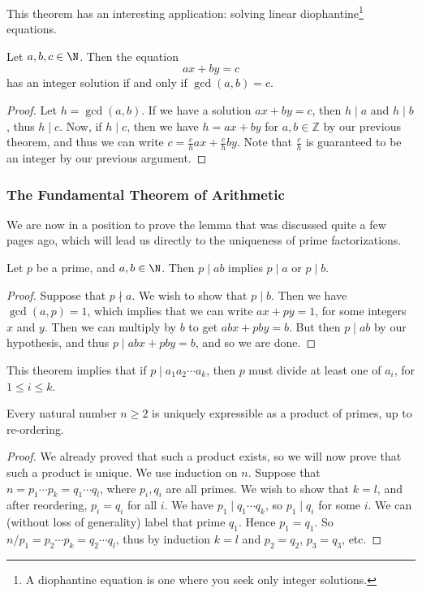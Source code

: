 \documentclass[a4paper]{scrartcl}
\begin{document}
This theorem has an interesting application: solving linear diophantine\footnote{A diophantine equation is one where you seek only integer solutions.} equations. 

\begin{corollary}
	Let $a, b, c \in \N$. Then the equation
	$$
	ax + by = c
	$$
	has an integer solution if and only if $\gcd(a, b) = c$.
\end{corollary}
\begin{proof}
	Let $h = \gcd(a, b)$. If we have a solution $ax + by = c$, then $h \mid a$ and $h \mid b$, thus $h \mid c$. Now, if $h \mid c$, then we have $h = ax + by$ for $a, b \in \mathbb{Z}$ by our previous theorem, and thus we can write $c = \frac{c}{h}ax + \frac{c}{h}by$. Note that $\frac{c}{h}$ is guaranteed to be an integer by our previous argument.
\end{proof}

\subsubsection{The Fundamental Theorem of Arithmetic}

We are now in a position to prove the lemma that was discussed quite a few pages ago, which will lead us directly to the uniqueness of prime factorizations.

\begin{theorem}
	Let $p$ be a prime, and $a, b \in \N$. Then $p \mid ab$ implies $p \mid a$ or $p \mid b$.
\end{theorem}
\begin{proof}
	Suppose that $p \nmid a$. We wish to show that $p \mid b$. Then we have $\gcd(a, p) = 1$, which implies that we can write $ax + py = 1$, for some integers $x$ and $y$. Then we can multiply by $b$ to get $abx + pby = b$. But then $p \mid ab$ by our hypothesis, and thus $p \mid abx + pby = b$, and so we are done.
\end{proof}

\begin{remark}
	This theorem implies that if $p \mid a_1 a_2 \cdots a_k$, then $p$ must divide at least one of $a_i$, for $1 \leq i \leq k$.
\end{remark}

\begin{theorem}
	Every natural number $n \geq 2$ is uniquely expressible as a product of primes, up to re-ordering.
\end{theorem}
\begin{proof}
	We already proved that such a product exists, so we will now prove that such a product is unique. We use induction on $n$.
	Suppose that $n = p_1 \cdots p_k = q_1 \cdots q_l$, where $p_i, q_i$ are all primes. We wish to show that $k = l$, and after reordering, $p_i = q_i$ for all $i$. We have $p_1 \mid q_1 \cdots q_k$, so $p_1 \mid q_i$ for some $i$. We can (without loss of generality) label that prime $q_1$. Hence $p_1 = q_1$. So $n/p_1 = p_2 \cdots p_k = q_2 \cdots q_l$, thus by induction $k = l$ and $p_2 = q_2$, $p_3 = q_3$, etc.
\end{proof}
\end{document}
